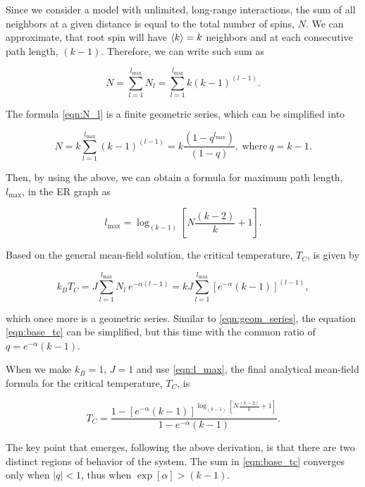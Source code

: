 \documentclass[11pt,a4paper]{article}
\begin{document}
Since we consider a model with unlimited, long-range interactions, the sum of all neighbors at a given distance is equal to the total number of spins, $N$. We can approximate, that root spin will have $\braket{k}=k$ neighbors and at each consecutive path length, $(k-1)$. Therefore, we can write such sum as

\begin{equation}\label{eqn:N_l}
    N = \sum_{l=1}^{l_{\max}} N_l = \sum_{l=1}^{l_{\max}} k (k-1)^{(l-1)}.
\end{equation}

The formula \eqref{eqn:N_l} is a finite geometric series, which can be simplified into

\begin{equation}\label{eqn:geom_series}
    N = k \sum_{l=1}^{l_{\max}} (k-1)^{(l-1)} = k\frac{(1 - q^{l_{\max}})}{(1 - q)},\ \text{where}\ q=k-1.
\end{equation}

Then, by using the above, we can obtain a formula for maximum path length, $l_{\max}$, in the ER graph as

\begin{equation}\label{eqn:l_max}
    l_{\max} = \log_{(k-1)}{\left[N\frac{(k-2)}{k} + 1\right]}.
\end{equation}

Based on the general mean-field solution, the critical temperature, $T_C$, is given by

\begin{equation}\label{eqn:base_tc}
    k_B T_C = J \sum_{l=1}^{l_{\max}} N_l~ e^{-\alpha (l-1)} = kJ \sum_{l=1}^{l_{\max}} \left[e^{-\alpha}(k-1)\right]^{(l-1)},
\end{equation}

which once more is a geometric series. Similar to \eqref{eqn:geom_series}, the equation \eqref{eqn:base_tc} can be simplified, but this time with the common ratio of $q=e^{-\alpha}(k-1)$.

When we make $k_B=1$, $J=1$ and use \eqref{eqn:l_max}, the final analytical mean-field formula for the critical temperature, $T_C$, is

\begin{equation}
    T_C = \frac{1 - [e^{-\alpha}(k-1)]^{\log_{(k-1)}{\left[N\frac{(k-2)}{k} + 1\right]}}}{1 - e^{-\alpha}(k-1)}.
\end{equation}

The key point that emerges, following the above derivation, is that there are two distinct regions of behavior of the system. The sum in \eqref{eqn:base_tc} converges only when $|q|<1$, thus when $\exp[\alpha] > (k-1)$.
\end{document}
